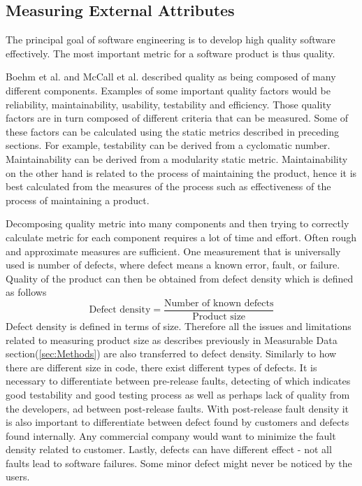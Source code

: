 \documentclass[11pt]{article}
\begin{document}
\subsection{Measuring External Attributes}
The principal goal of software engineering is to develop high quality software effectively. The most important metric for a software product is thus quality. 
\par 
Boehm et al. and McCall et al. described quality as being composed of many different components. Examples of some important quality factors would be reliability, maintainability, usability, testability and efficiency. Those quality factors are in turn composed of different criteria that can be measured. Some of these factors can be calculated using the static metrics described in preceding sections. For example, testability can be derived from a cyclomatic number. Maintainability can be derived from a modularity static metric. Maintainability on the other hand is related to the process of maintaining the product, hence it is best calculated from the measures of the process such as effectiveness of the process of maintaining a product.
\par 
Decomposing quality metric into many components and then trying to correctly calculate metric for each component requires a lot of time and effort. Often rough and approximate measures are sufficient. One measurement that is universally used is number of defects, where defect means a known error, fault, or failure. Quality of the product can then be obtained from defect density which is defined as follows \[\text{Defect density}=\frac{\text{Number of known defects}}{\text{Product size}}\]
Defect density is defined in terms of size. Therefore all the issues and limitations related to measuring product size as describes previously in Measurable Data section(\ref*{sec:Methods}) are also transferred to defect density. Similarly to how there are different size in code, there exist  different types of defects. It is necessary to differentiate between pre-release faults, detecting of which indicates good testability and good testing process as well as perhaps lack of quality from the developers, ad between post-release faults. With post-release fault density it is also important to differentiate between defect found by customers and defects found internally. Any commercial company would want to minimize the fault density related to customer. Lastly, defects can have different effect - not all faults lead to software failures. Some minor defect might never be noticed by the users.
\end{document}
